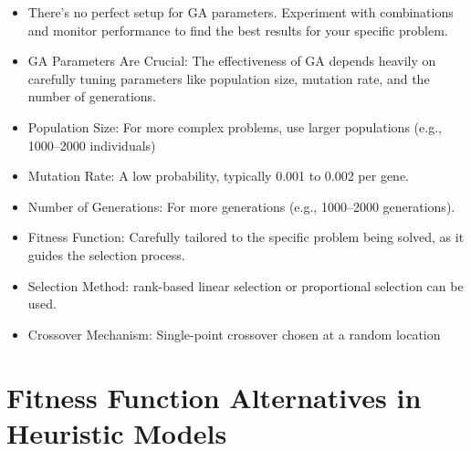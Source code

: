 \documentclass[
  letterpaper,
  DIV=11,
  numbers=noendperiod]{scrreprt}
\providecommand{\tightlist}{%
  \setlength{\itemsep}{0pt}\setlength{\parskip}{0pt}}\usepackage{longtable,booktabs,array}
\begin{document}
\begin{itemize}
\tightlist
\item
  There's no perfect setup for GA parameters. Experiment with
  combinations and monitor performance to find the best results for your
  specific problem.
\item
  GA Parameters Are Crucial: The effectiveness of GA depends heavily on
  carefully tuning parameters like population size, mutation rate, and
  the number of generations.
\item
  Population Size: For more complex problems, use larger populations
  (e.g., 1000--2000 individuals)
\item
  Mutation Rate: A low probability, typically 0.001 to 0.002 per gene.
\item
  Number of Generations: For more generations (e.g., 1000--2000
  generations).
\item
  Fitness Function: Carefully tailored to the specific problem being
  solved, as it guides the selection process.
\item
  Selection Method: rank-based linear selection or proportional
  selection can be used.
\item
  Crossover Mechanism: Single-point crossover chosen at a random
  location
\end{itemize}

\section{Fitness Function Alternatives in Heuristic
Models}\label{fitness-function-alternatives-in-heuristic-models}
\end{document}
